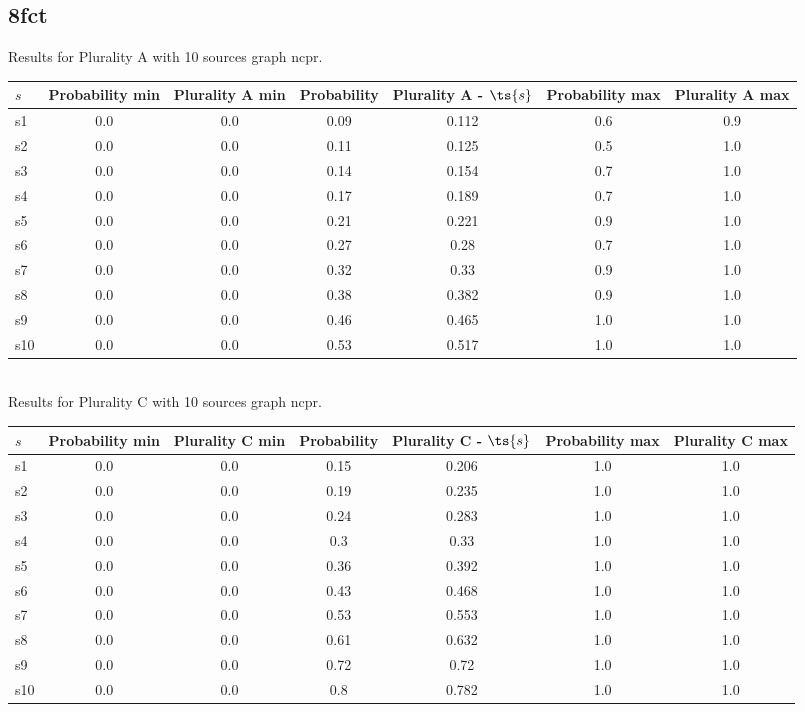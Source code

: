 \documentclass{article}
\begin{document}
\newpage

\subsection{8fct}

\noindent Results for Plurality A with 10 sources graph ncpr.

\noindent\begin{tabular}{|l|c|c|c|c|c|c|}
\hline
$s$& Probability min & Plurality A min & Probability & Plurality A - $\ts{s}$ & Probability max & Plurality A max\\
\hline
s1 &0.0 & 0.0 & 0.09 & 0.112 & 0.6 & 0.9\\
\hline
s2 &0.0 & 0.0 & 0.11 & 0.125 & 0.5 & 1.0\\
\hline
s3 &0.0 & 0.0 & 0.14 & 0.154 & 0.7 & 1.0\\
\hline
s4 &0.0 & 0.0 & 0.17 & 0.189 & 0.7 & 1.0\\
\hline
s5 &0.0 & 0.0 & 0.21 & 0.221 & 0.9 & 1.0\\
\hline
s6 &0.0 & 0.0 & 0.27 & 0.28 & 0.7 & 1.0\\
\hline
s7 &0.0 & 0.0 & 0.32 & 0.33 & 0.9 & 1.0\\
\hline
s8 &0.0 & 0.0 & 0.38 & 0.382 & 0.9 & 1.0\\
\hline
s9 &0.0 & 0.0 & 0.46 & 0.465 & 1.0 & 1.0\\
\hline
s10 &0.0 & 0.0 & 0.53 & 0.517 & 1.0 & 1.0\\
\hline
\end{tabular}\\

\noindent Results for Plurality C with 10 sources graph ncpr.

\noindent\begin{tabular}{|l|c|c|c|c|c|c|}
\hline
$s$& Probability min & Plurality C min & Probability & Plurality C - $\ts{s}$ & Probability max & Plurality C max\\
\hline
s1 &0.0 & 0.0 & 0.15 & 0.206 & 1.0 & 1.0\\
\hline
s2 &0.0 & 0.0 & 0.19 & 0.235 & 1.0 & 1.0\\
\hline
s3 &0.0 & 0.0 & 0.24 & 0.283 & 1.0 & 1.0\\
\hline
s4 &0.0 & 0.0 & 0.3 & 0.33 & 1.0 & 1.0\\
\hline
s5 &0.0 & 0.0 & 0.36 & 0.392 & 1.0 & 1.0\\
\hline
s6 &0.0 & 0.0 & 0.43 & 0.468 & 1.0 & 1.0\\
\hline
s7 &0.0 & 0.0 & 0.53 & 0.553 & 1.0 & 1.0\\
\hline
s8 &0.0 & 0.0 & 0.61 & 0.632 & 1.0 & 1.0\\
\hline
s9 &0.0 & 0.0 & 0.72 & 0.72 & 1.0 & 1.0\\
\hline
s10 &0.0 & 0.0 & 0.8 & 0.782 & 1.0 & 1.0\\
\hline
\end{tabular}\\
\end{document}
